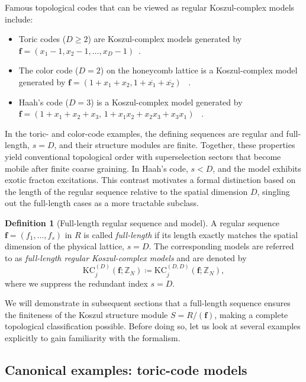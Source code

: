 \documentclass[aps,prx,english,superscriptaddress,twocolumn,tightenlines,showpacs,longbibliography,floatfix,amsfonts]{revtex4-2}
\theoremstyle{remark}
\theoremstyle{definition}
\newtheorem{definition}{Definition}
\begin{document}
Famous topological codes that can be viewed as regular Koszul-complex models include:
\begin{itemize}
	\item Toric codes ($D \geq 2$) are Koszul-complex models generated by
	\(\mathbf{f}=(x_1-1,x_2-1,\dots,x_D-1)\)~\cite{Kitaev2003Anyons}.
	\item The color code ($D = 2$) on the honeycomb lattice is a
	Koszul-complex model generated by
	\(\mathbf{f}=(1+x_1+x_2,1+\overline{x_1}+\overline{x_2})\)
	~\cite{BombinMartinDelgado2006}.
	\item Haah's code ($D = 3$) is a Koszul-complex model generated by
	\(\mathbf{f}=(1+x_1+x_2+x_3,\,1+x_1x_2+x_2x_3+x_3x_1)\)
	~\cite{Haah2011PRA}.
\end{itemize}
In the toric- and color-code examples, the defining sequences are regular
and full-length, $s=D$, and their structure modules are finite. Together,
these properties yield conventional topological order with superselection
sectors that become mobile after finite coarse graining. In Haah's code,
$s<D$, and the model exhibits exotic fracton excitations. This contrast
motivates a formal distinction based on the length of the regular sequence
relative to the spatial dimension $D$, singling out the full-length cases as
a more tractable subclass.

\begin{definition}[Full-length regular sequence and model]
	\label{def:full-length-regular-sequence}
	A regular sequence $\mathbf{f} = (f_1,\dots,f_s)$ in $R$ is called \emph{full-length} if its length exactly matches the spatial dimension of the physical lattice, $s = D$. The corresponding models are referred to as \emph{full-length regular Koszul-complex models} and are denoted by
	\begin{equation}
		\mathrm{KC}_j^{(D)}(\mathbf{f};\mathbb{Z}_N) \coloneqq \mathrm{KC}_j^{(D,D)}(\mathbf{f};\mathbb{Z}_N),
	\end{equation}
	where we suppress the redundant index $s=D$.
\end{definition}

We will demonstrate in subsequent sections that a full-length sequence ensures the finiteness of the Koszul structure module $S=R/(\mathbf{f})$, making a complete topological classification possible. Before doing so, let us look at several examples explicitly to gain familiarity with the formalism.

\subsection{Canonical examples: toric-code models}
\label{sec:tc_models}
\end{document}
